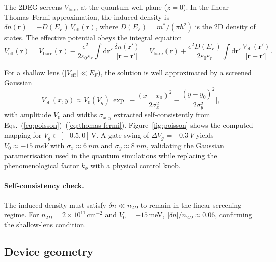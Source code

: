 \documentclass[11pt,a4paper]{article}
\newcommand{\dd}{\mathrm{d}}
\begin{document}
The 2DEG screens $V_{\text{bare}}$ at the quantum-well plane ($z=0$). In the 
linear Thomas--Fermi approximation, the induced density is 
$\delta n(\mathbf{r}) = -D(E_F)\,V_{\text{eff}}(\mathbf{r})$, where 
$D(E_F)=m^*/(\pi\hbar^2)$ is the 2D density of states. The effective 
potential obeys the integral equation
\begin{equation}
V_{\text{eff}}(\mathbf{r}) = V_{\text{bare}}(\mathbf{r}) - 
\frac{e^2}{2\varepsilon_0\varepsilon_r}\int \dd\mathbf{r}'\,
\frac{\delta n(\mathbf{r}')}{|\mathbf{r}-\mathbf{r}'|}
= V_{\text{bare}}(\mathbf{r}) + \frac{e^2 D(E_F)}{2\varepsilon_0\varepsilon_r}
\int \dd\mathbf{r}'\,\frac{V_{\text{eff}}(\mathbf{r}')}{|\mathbf{r}-\mathbf{r}'|}.
\label{eq:thomas-fermi}
\end{equation}

For a shallow lens ($|V_{\text{eff}}|\ll E_F$), the solution is well 
approximated by a screened Gaussian
\begin{equation}
V_{\text{eff}}(x,y) \approx V_0(V_g)\,
\exp\!\Big[-\frac{(x-x_0)^2}{2\sigma_x^2}-\frac{(y-y_0)^2}{2\sigma_y^2}\Big],
\label{eq:veff}
\end{equation}
with amplitude $V_0$ and widths $\sigma_{x,y}$ extracted self-consistently 
from Eqs.~(\ref{eq:poisson})--(\ref{eq:thomas-fermi}). Figure~\ref{fig:poisson} 
shows the computed mapping for $V_g\in[-0.5,0]\,$V. A gate swing of 
$\Delta V_g=\SI{-0.3}{V}$ yields $V_0\approx\SI{-15}{meV}$ with 
$\sigma_x\approx\SI{6}{nm}$ and $\sigma_y\approx\SI{8}{nm}$, validating the 
Gaussian parametrisation used in the quantum simulations while replacing the 
phenomenological factor $k_\phi$ with a physical control knob.

\paragraph{Self-consistency check.} The induced density must satisfy 
$\delta n \ll n_{2D}$ to remain in the linear-screening regime. For 
$n_{2D}=2\times10^{11}\,\text{cm}^{-2}$ and $V_0=-15\,$meV, 
$|\delta n|/n_{2D}\approx 0.06$, confirming the shallow-lens condition.

\subsection{Device geometry}
\label{sec:geometry}
\end{document}
